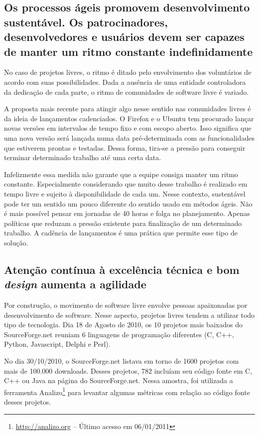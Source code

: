 \subsection[Ritmo sustentável]{Os processos ágeis promovem
  desenvolvimento sustentável. Os patrocinadores, desenvolvedores e
  usuários devem ser capazes de manter um ritmo constante
  indefinidamente}

No caso de projetos livres, o ritmo é ditado pelo envolvimento dos
voluntários de acordo com suas possibilidades. Dada a ausência de uma
entidade controladora da dedicação de cada parte, o ritmo de
comunidades de software livre é variado.

A proposta mais recente para atingir algo nesse sentido nas
comunidades livres é da ideia de lançamentos cadenciados. O Firefox e
o Ubuntu tem procurado lançar novas versões em intervalos de tempo
fixo e com escopo aberto. Isso significa que uma nova versão será
lançada numa data pré-determinada com as funcionalidades que estiverem
prontas e testadas.  Dessa forma, tira-se a pressão para conseguir
terminar determinado trabalho até uma certa data.

Infelizmente essa medida não garante que a equipe consiga manter um
ritmo constante. Especialmente considerando que muito desse trabalho é
realizado em tempo livre e sujeito à disponibilidade de cada um. Nesse
contexto, sustentável pode ter um sentido um pouco diferente do
sentido usado em métodos ágeis. Não é mais possível pensar em jornadas
de 40 horas e folga no planejamento. Apenas políticas que reduzam a
pressão existente para finalização de um determinado trabalho. A
cadência de lançamentos é uma prática que permite esse tipo de
solução.

\subsection[Excelência técnica]{Atenção contínua à excelência técnica
  e bom \textit{design} aumenta a agilidade}

Por construção, o movimento de software livre envolve pessoas
apaixonadas por desenvolvimento de software. Nesse aspecto, projetos
livres tendem a utilizar todo tipo de tecnologia.  Dia 18 de Agosto de
2010, os 10 projetos mais baixados do SourceForge.net reuniam 6
linguagens de programação diferentes (C, C++, Python, Javascript,
Delphi e Perl).

No dia 30/10/2010, o SourceForge.net listava em torno de 1600 projetos
com mais de 100.000 downloads. Desses projetos, 782 incluíam seu
código fonte em C, C++ ou Java na página do SourceForge.net.  Nessa
amostra, foi utilizada a ferramenta
Analizo\footnote{\url{http://analizo.org} -- Último acesso em 06/01/2011}
para levantar algumas métricas com relação ao código fonte desses
projetos.

